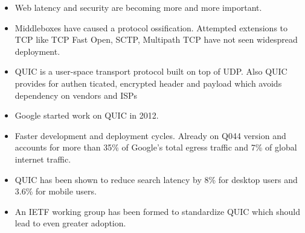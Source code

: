 





\begin{frame}

\begin{itemize}
    \item Web latency and security are becoming more and more important.
    
    \item Middleboxes have caused a protocol ossification. Attempted extensions to TCP like TCP Fast Open\cite{DBLP:conf/conext/RadhakrishnanCCJR11}, SCTP\cite{rfc3286}, Multipath TCP \cite{rfc6824} have not seen widespread deployment.
    
    \item QUIC is a user-space transport protocol built on top of UDP. Also QUIC provides for authen
    ticated, encrypted header and payload which avoids dependency on vendors
    and ISPs
    
    \item Google started work on QUIC in 2012. 
    
    \item Faster development and deployment cycles. Already on Q044 version and accounts for more than 35\% of
    Google’s total egress traffic and 7\% of global internet traffic.
    
    \item  QUIC has been shown to reduce search latency by 8\% for desktop users and 3.6\% for mobile users.\cite{DBLP:conf/sigcomm/LangleyRWVKZYKS17}
    
    \item An IETF working group has been
    formed to standardize QUIC which should lead to even greater adoption.
    
\end{itemize}
\end{frame}
\clearpage


